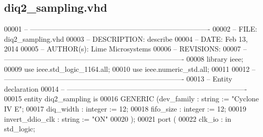 \subsection{diq2\+\_\+sampling.\+vhd}
\label{diq2__sampling_8vhd_source}

\begin{DoxyCode}
00001 \textcolor{keyword}{-- ---------------------------------------------------------------------------- }
00002 \textcolor{keyword}{-- FILE:    diq2\_sampling.vhd}
00003 \textcolor{keyword}{-- DESCRIPTION: describe}
00004 \textcolor{keyword}{-- DATE:    Feb 13, 2014}
00005 \textcolor{keyword}{-- AUTHOR(s):   Lime Microsystems}
00006 \textcolor{keyword}{-- REVISIONS:}
00007 \textcolor{keyword}{-- ---------------------------------------------------------------------------- }
00008 \textcolor{vhdlkeyword}{library }\textcolor{keywordflow}{ieee};
00009 \textcolor{vhdlkeyword}{use }ieee.std\_logic\_1164.\textcolor{keywordflow}{all};
00010 \textcolor{vhdlkeyword}{use }ieee.numeric\_std.\textcolor{keywordflow}{all};
00011 
00012 \textcolor{keyword}{-- ----------------------------------------------------------------------------}
00013 \textcolor{keyword}{-- Entity declaration}
00014 \textcolor{keyword}{-- ----------------------------------------------------------------------------}
00015 \textcolor{keywordflow}{entity }diq2_sampling \textcolor{keywordflow}{is}
00016     \textcolor{keywordflow}{GENERIC} \textcolor{vhdlchar}{(}\textcolor{vhdlchar}{dev_family}         \textcolor{vhdlchar}{:} \textcolor{comment}{string}        \textcolor{vhdlchar}{:=} \textcolor{keyword}{"Cyclone IV E"};
00017                 \textcolor{vhdlchar}{diq_width}           \textcolor{vhdlchar}{:} \textcolor{comment}{integer}   \textcolor{vhdlchar}{:=} \textcolor{vhdllogic}{}\textcolor{vhdllogic}{12};
00018                 \textcolor{vhdlchar}{fifo_size}           \textcolor{vhdlchar}{:} \textcolor{comment}{integer}   \textcolor{vhdlchar}{:=} \textcolor{vhdllogic}{}\textcolor{vhdllogic}{12};
00019                 \textcolor{vhdlchar}{invert_ddio_clk} \textcolor{vhdlchar}{:} \textcolor{comment}{string}    \textcolor{vhdlchar}{:=} \textcolor{keyword}{"ON"}
00020                 \textcolor{vhdlchar}{)};
00021     \textcolor{keywordflow}{port} \textcolor{vhdlchar}{(}
00022         \textcolor{vhdlchar}{clk_io}          \textcolor{vhdlchar}{:} \textcolor{keywordflow}{in} \textcolor{comment}{std\_logic};

\end{DoxyCode}
